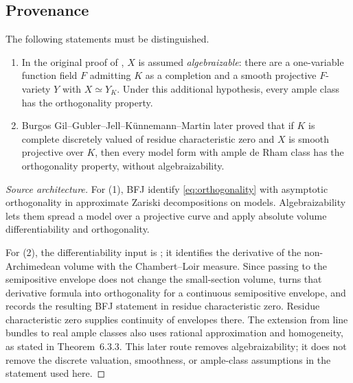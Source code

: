 \subsection{Provenance}
\label{sec:ch27-orthogonality-provenance}

\begin{theorem}\label{thm:orthogonality-provenance}
The following statements must be distinguished.
\begin{enumerate}
\item In the original proof of \cite[Theorem~A.6]{BFJ15}, $X$ is assumed
\emph{algebraizable}: there are a one-variable function field $F$ admitting
$K$ as a completion and a smooth projective $F$-variety $Y$ with
$X\simeq Y_K$. Under this additional hypothesis, every ample class has the
orthogonality property.
\item Burgos Gil--Gubler--Jell--K\"unnemann--Martin later proved that if
$K$ is complete discretely valued of residue characteristic zero and $X$
is smooth projective over $K$, then every model form with ample de Rham
class has the orthogonality property, without algebraizability.
\end{enumerate}
\par
\end{theorem}

\begin{proof}[Source architecture]
For (1), BFJ identify \eqref{eq:orthogonality} with asymptotic orthogonality
in approximate Zariski decompositions on models. Algebraizability lets them
spread a model over a projective curve and apply absolute volume
differentiability and orthogonality.

For (2), the differentiability input is
\cite[Theorem~5.4.3]{BGGJKM20}; it identifies the derivative of the
non-Archimedean volume with the Chambert--Loir measure.  Since passing to
the semipositive envelope does not change the small-section volume,
\cite[Theorem~6.3.2]{BGGJKM20} turns that derivative formula into
orthogonality for a continuous semipositive envelope, and
\cite[Theorem~6.3.3]{BGGJKM20} records the resulting BFJ statement in
residue characteristic zero.  Residue characteristic zero supplies continuity of envelopes there.
The extension from line bundles to real ample classes also uses rational
approximation and homogeneity, as stated in Theorem~6.3.3.  This later route
removes algebraizability; it does not remove the discrete valuation,
smoothness, or ample-class assumptions in the statement used here.
\end{proof}

